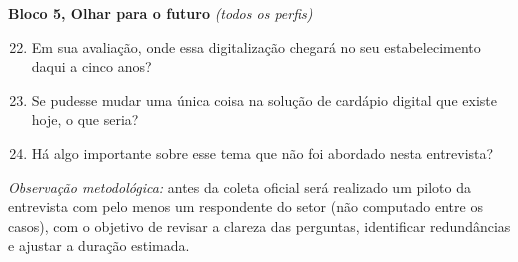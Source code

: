 \noindent\textbf{Bloco 5, Olhar para o futuro} \emph{(todos os perfis)}
\begin{enumerate}\setcounter{enumi}{21}
	\item Em sua avaliação, onde essa digitalização chegará no seu estabelecimento daqui a cinco anos?
	\item Se pudesse mudar uma única coisa na solução de cardápio digital que existe hoje, o que seria?
	\item Há algo importante sobre esse tema que não foi abordado nesta entrevista?
\end{enumerate}

\noindent\emph{Observação metodológica:} antes da coleta oficial será realizado um piloto da entrevista com pelo menos um respondente do setor (não computado entre os casos), com o objetivo de revisar a clareza das perguntas, identificar redundâncias e ajustar a duração estimada.
